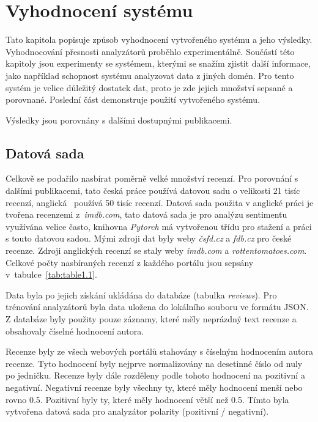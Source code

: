 \chapter{Vyhodnocení systému}
\label{vysledky}

Tato kapitola popisuje způsob vyhodnocení vytvořeného systému a jeho výsledky. Vyhodnocování přesnosti analyzátorů proběhlo experimentálně. Součástí této kapitoly jsou experimenty se systémem, kterými se snažím zjistit další informace, jako například schopnost systému analyzovat data z jiných domén. Pro tento systém je velice důležitý dostatek dat, proto je zde jejich množství sepsané a porovnané. Poslední část demonstruje použití vytvořeného systému.

Výsledky jsou porovnány s dalšími dostupnými publikacemi.


\section{Datová sada}


Celkově se podařilo nasbírat poměrně velké množství recenzí. Pro porovnání s dalšími publikacemi, tato česká práce \cite{cz_dataset} používá datovou sadu o velikosti 21 tisíc recenzí, anglická~\cite{en_dataset} používá 50 tisíc recenzí. Datová sada použita v anglické práci je tvořena recenzemi z~\emph{imdb.com}, tato datová sada je pro analýzu sentimentu využívána velice často, knihovna \emph{Pytorch} má vytvořenou třídu pro stažení a práci s touto datovou sadou. Mými zdroji dat byly weby \emph{čsfd.cz} a \emph{fdb.cz} pro české recenze. Zdroji anglických recenzí se staly weby \emph{imdb.com} a \emph{rottentomatoes.com}. Celkové počty nasbíraných recenzí z každého portálu jsou sepsány v~tabulce~\ref{tab:table1.1}. 

Data byla po jejich získání ukládána do databáze (tabulka \emph{reviews}). Pro trénování analyzátorů byla data uložena do lokálního souboru ve formátu JSON. Z databáze byly použity pouze záznamy, které měly neprázdný text recenze a obsahovaly číselné hodnocení autora.

Recenze byly ze všech webových portálů stahovány s číselným hodnocením autora recenze. Tyto hodnocení byly nejprve normalizovány na desetinné číslo od nuly po jedničku. Recenze byly dále rozděleny podle tohoto hodnocení na pozitivní a negativní. Negativní recenze byly všechny ty, které měly hodnocení menší nebo rovno 0.5. Pozitivní byly ty, které měly hodnocení větší než 0.5. Tímto byla vytvořena datová sada pro analyzátor polarity (pozitivní / negativní). 

